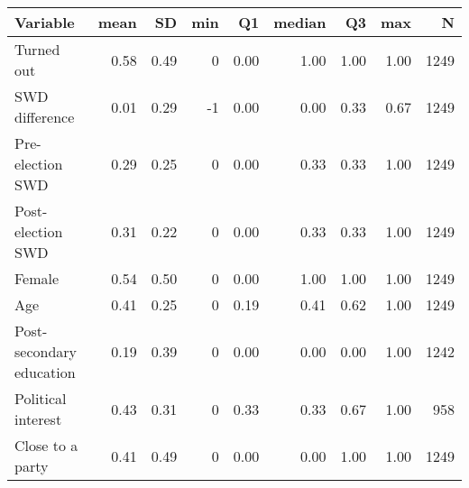 
\begin{tabular}{l|r|r|r|r|r|r|r|r}
\hline
Variable & mean & SD & min & Q1 & median & Q3 & max & N\\
\hline
Turned out & 0.58 & 0.49 & 0 & 0.00 & 1.00 & 1.00 & 1.00 & 1249\\
\hline
SWD difference & 0.01 & 0.29 & -1 & 0.00 & 0.00 & 0.33 & 0.67 & 1249\\
\hline
Pre-election SWD & 0.29 & 0.25 & 0 & 0.00 & 0.33 & 0.33 & 1.00 & 1249\\
\hline
Post-election SWD & 0.31 & 0.22 & 0 & 0.00 & 0.33 & 0.33 & 1.00 & 1249\\
\hline
Female & 0.54 & 0.50 & 0 & 0.00 & 1.00 & 1.00 & 1.00 & 1249\\
\hline
Age & 0.41 & 0.25 & 0 & 0.19 & 0.41 & 0.62 & 1.00 & 1249\\
\hline
Post-secondary education & 0.19 & 0.39 & 0 & 0.00 & 0.00 & 0.00 & 1.00 & 1242\\
\hline
Political interest & 0.43 & 0.31 & 0 & 0.33 & 0.33 & 0.67 & 1.00 & 958\\
\hline
Close to a party & 0.41 & 0.49 & 0 & 0.00 & 0.00 & 1.00 & 1.00 & 1249\\
\hline
\end{tabular}
